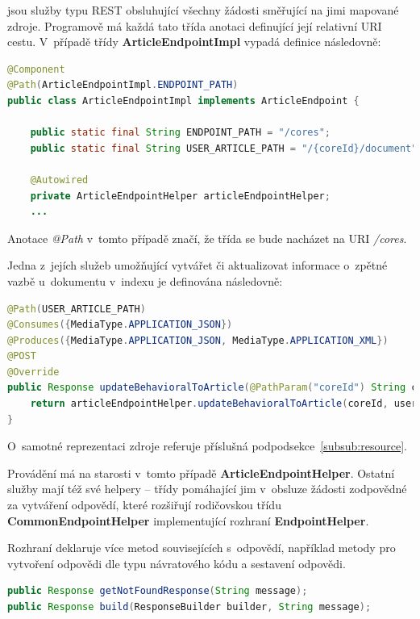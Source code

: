 \documentclass[thesis=M,czech]{FITthesis}[2014/05/07]
\begin{document}
jsou služby typu REST obsluhující všechny žádosti směřující na jimi mapované zdroje. Programově má každá tato třída anotaci definující její relativní URI cestu. V~případě třídy \textbf{ArticleEndpointImpl} vypadá definice následovně:

\begin{lstlisting}[language=java]
@Component
@Path(ArticleEndpointImpl.ENDPOINT_PATH)
public class ArticleEndpointImpl implements ArticleEndpoint {
    
    public static final String ENDPOINT_PATH = "/cores";
    public static final String USER_ARTICLE_PATH = "/{coreId}/document";

    @Autowired
    private ArticleEndpointHelper articleEndpointHelper;  	
    ...
\end{lstlisting}

Anotace \emph{@Path} v~tomto případě značí, že třída se bude nacházet na URI \emph{/cores}.

Jedna z~jejích služeb umožňující vytvářet či aktualizovat informace o~zpětné vazbě u~dokumentu v~indexu je definována následovně:

\begin{lstlisting}[language=java]
@Path(USER_ARTICLE_PATH)
@Consumes({MediaType.APPLICATION_JSON})
@Produces({MediaType.APPLICATION_JSON, MediaType.APPLICATION_XML})
@POST
@Override
public Response updateBehavioralToArticle(@PathParam("coreId") String coreId, UserArticleDocument userArticle) {
    return articleEndpointHelper.updateBehavioralToArticle(coreId, userArticle);
} 
\end{lstlisting}

O~samotné reprezentaci zdroje referuje příslušná podpodsekce~\ref{subsub:resource}.

Provádění má na starosti v~tomto případě \textbf{ArticleEndpointHelper}. Ostatní služby mají též své helpery – třídy pomáhající jim v~obsluze žádosti zodpovědné za vytváření odpovědí, které rozšiřují rodičovskou třídu \textbf{CommonEndpointHelper} implementující rozhraní \textbf{EndpointHelper}.

Rozhraní deklaruje více metod souvisejících s~odpovědí, například metody pro vytvoření odpovědi dle typu návratového kódu a sestavení odpovědi.

\begin{lstlisting}[language=java]
public Response getNotFoundResponse(String message);
public Response build(ResponseBuilder builder, String message);
\end{lstlisting}
\end{document}
